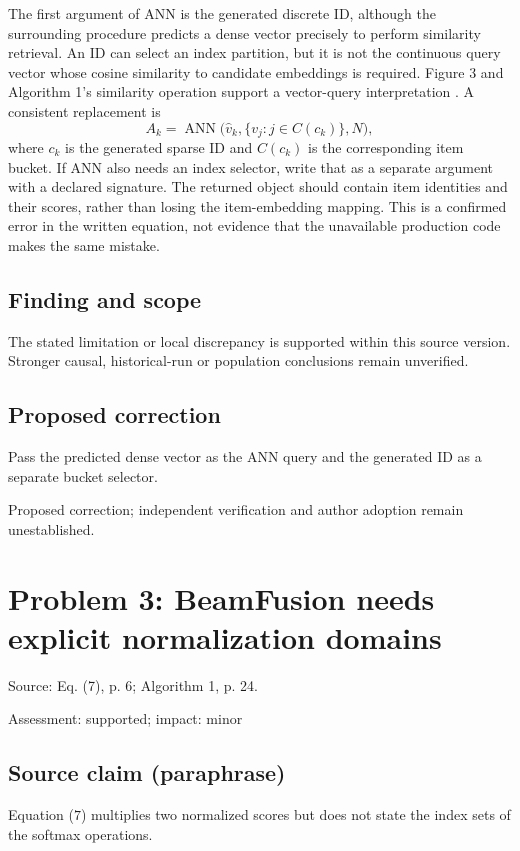 \documentclass[11pt]{article}
\begin{document}
The first argument of ANN is the generated discrete ID, although the surrounding procedure predicts a dense vector precisely to perform similarity retrieval. An ID can select an index partition, but it is not the continuous query vector whose cosine similarity to candidate embeddings is required. Figure 3 and Algorithm 1's similarity operation support a vector-query interpretation . A consistent replacement is \[
A_k = \operatorname{ANN}\bigl(\widehat v_k,
\{v_j:j\in C(c_k)\},N\bigr),
\] where \(c_k\) is the generated sparse ID and \(C(c_k)\) is the corresponding item bucket. If ANN also needs an index selector, write that as a separate argument with a declared signature. The returned object should contain item identities and their scores, rather than losing the item-embedding mapping. This is a confirmed error in the written equation, not evidence that the unavailable production code makes the same mistake.

\subsection*{Finding and scope}

The stated limitation or local discrepancy is supported within this source version. Stronger causal, historical-run or population conclusions remain unverified.

\subsection*{Proposed correction}

Pass the predicted dense vector as the ANN query and the generated ID as a separate bucket selector.

Proposed correction; independent verification and author adoption remain unestablished.

\section*{Problem 3: BeamFusion needs explicit normalization domains}

Source: Eq. (7), p. 6; Algorithm 1, p. 24.

Assessment: supported; impact: minor

\subsection*{Source claim (paraphrase)}

Equation (\(7\)) multiplies two normalized scores but does not state the index sets of the softmax operations.
\end{document}
